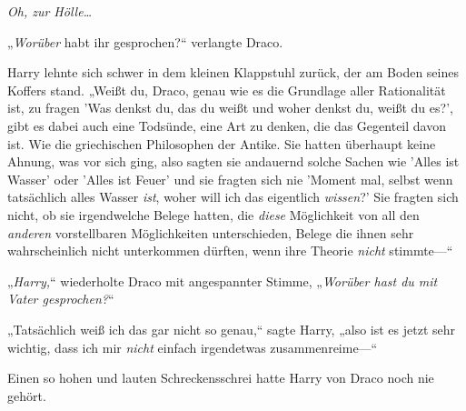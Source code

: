 \emph{Oh, zur Hölle…}

„\emph{Worüber} habt ihr gesprochen?“ verlangte Draco.

Harry lehnte sich schwer in dem kleinen Klappstuhl zurück, der am Boden seines Koffers stand. „Weißt du, Draco, genau wie es die Grundlage aller Rationalität ist, zu fragen 'Was denkst du, das du weißt und woher denkst du, weißt du es?', gibt es dabei auch eine Todsünde, eine Art zu denken, die das Gegenteil davon ist. Wie die griechischen Philosophen der Antike. Sie hatten überhaupt keine Ahnung, was vor sich ging, also sagten sie andauernd solche Sachen wie 'Alles ist Wasser' oder 'Alles ist Feuer' und sie fragten sich nie 'Moment mal, selbst wenn tatsächlich alles Wasser \emph{ist}, woher will ich das eigentlich \emph{wissen}?' Sie fragten sich nicht, ob sie irgendwelche Belege hatten, die \emph{diese} Möglichkeit von all den \emph{anderen} vorstellbaren Möglichkeiten unterschieden, Belege die ihnen sehr wahrscheinlich nicht unterkommen dürften, wenn ihre Theorie \emph{nicht} stimmte—“

„\emph{Harry,}“ wiederholte Draco mit angespannter Stimme, „\emph{Worüber hast du mit Vater gesprochen?}“

„Tatsächlich weiß ich das gar nicht so genau,“ sagte Harry, „also ist es jetzt sehr wichtig, dass ich mir \emph{nicht} einfach irgendetwas zusammenreime—“

Einen so hohen und lauten Schreckensschrei hatte Harry von Draco noch nie gehört.

